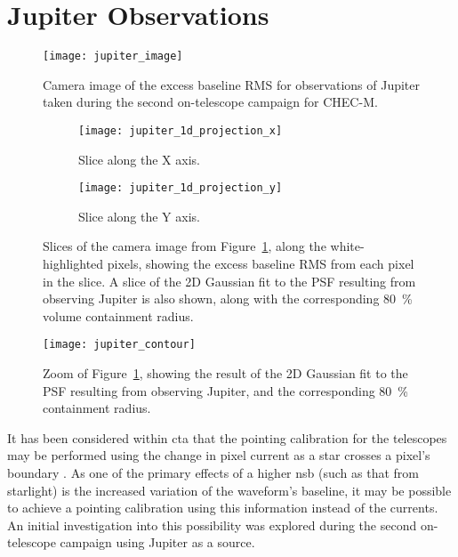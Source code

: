 \section{Jupiter Observations}

\begin{figure}
  \texttt{[image: jupiter\_image]}
  \caption[Camera image of the excess baseline RMS for observations of Jupiter.]{Camera image of the excess baseline RMS for observations of Jupiter taken during the second on-telescope campaign for CHEC-M.}
  \label{fig:jupiter_image}
\end{figure}

\begin{figure}
  \begin{subfigure}[b]{0.49\textwidth}
    \texttt{[image: jupiter\_1d\_projection\_x]}
    \caption{Slice along the X axis.}
    \label{fig:jupiter_1d_projection_x}
  \end{subfigure}
  \hfill
  \begin{subfigure}[b]{0.49\textwidth}
    \texttt{[image: jupiter\_1d\_projection\_y]}
    \caption{Slice along the Y axis.}
    \label{fig:jupiter_1d_projection_y}
  \end{subfigure}
  \caption[Camera slices of the Jupiter observations.]{Slices of the camera image from Figure~\ref{fig:jupiter_image}, along the white-highlighted pixels, showing the excess baseline RMS from each pixel in the slice. A slice of the 2D Gaussian fit to the PSF resulting from observing Jupiter is also shown, along with the corresponding \SI{80}{\percent} volume containment radius.}
  \label{fig:jupiter_1d_projection}
\end{figure}

\begin{figure}
  \texttt{[image: jupiter\_contour]}
  \caption[Zoom of the Jupiter camera image.]{Zoom of Figure~\ref{fig:jupiter_image}, showing the result of the 2D Gaussian fit to the PSF resulting from observing Jupiter, and the corresponding \SI{80}{\percent} containment radius.}
  \label{fig:jupiter_contour}
\end{figure}

It has been considered within \gls{cta} that the pointing calibration for the telescopes may be performed using the change in pixel current as a star crosses a pixel's boundary \cite{Gaug2014}. As one of the primary effects of a higher \gls{nsb} (such as that from starlight) is the increased variation of the waveform's baseline, it may be possible to achieve a pointing calibration using this information instead of the currents. An initial investigation into this possibility was explored during the second on-telescope campaign using Jupiter as a source.

